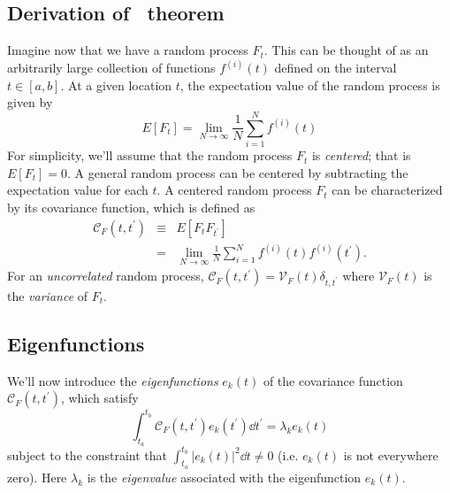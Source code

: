 \subsection{Derivation of \KL\ theorem}
Imagine now that we have a random process $F_t$.  This can be thought of as
an arbitrarily large collection of functions $f^{(i)}(t)$ defined
on the interval
$t \in [a, b]$.  At a given location $t$, the expectation value of the
random process is given by
\begin{equation}
  E[F_t] = \lim_{N \to \infty} \frac{1}{N} \sum_{i=1}^N f^{(i)}(t)
\end{equation}
For simplicity, we'll assume that the random process $F_t$ is {\it
centered}; that is $E[F_t] = 0$.  A general random process can be
centered by subtracting the expectation value for each $t$.
A centered random process $F_t$ can be characterized
by its covariance function, which is defined as
\begin{eqnarray}
  \label{eq:corrfunc_def}
  \mathcal{C}_F(t, t^\prime) &\equiv& E[F_t F_{t^\prime}]
  \nonumber\\
  &=& \lim_{N\to\infty}\frac{1}{N} \sum_{i=1}^N
  f^{(i)}(t)f^{(i)}(t^\prime).
\end{eqnarray}
For an {\it uncorrelated} random process,
$\mathcal{C}_F(t, t^\prime) = \mathcal{V}_F(t) \delta_{t, t^\prime}$
where $\mathcal{V}_F(t) $ is the {\it variance} of $F_t$.

\subsection{Eigenfunctions}
We'll now introduce the {\it eigenfunctions} $e_k(t)$
of the covariance function $\mathcal{C}_F(t, t^\prime)$, which satisfy
\begin{equation}
  \label{eq:eigfunc_def}
  \int_{t_a}^{t_b} \mathcal{C}_F(t, t^\prime) e_k(t^\prime)\dd t^\prime
  = \lambda_k e_k(t)
\end{equation}
subject to the constraint that $\int_{t_a}^{t_b}|e_k(t)|^2\dd t \ne 0$
(i.e. $e_k(t)$ is not everywhere zero).
Here $\lambda_k$ is the {\it eigenvalue} associated with the
eigenfunction $e_k(t)$.

